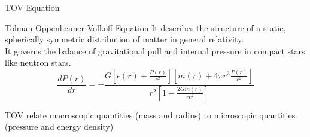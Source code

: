 \documentclass[12pt,aspectratio169]{beamer}
\begin{document}
\begin{frame}{TOV Equation}
\begin{block}{Tolman-Oppenheimer-Volkoff Equation}
It describes the structure of a static, spherically symmetric distribution of matter in general relativity.\\
It governs the balance of gravitational pull and internal pressure in compact stars like neutron stars.
$$ \frac{dP(r)}{dr} = -\frac{G[\epsilon(r)+\frac{P(r)}{c^2}][m(r)+4\pi r^3\frac{P(r)}{c^2}]}{r^2[1-\frac{2Gm(r)}{rc^2}]}$$

\end{block}
\begin{block}{}
    TOV relate macroscopic quantities (mass and radius) to microscopic quantities (pressure and energy density)
\end{block}
\end{frame}
\end{document}
